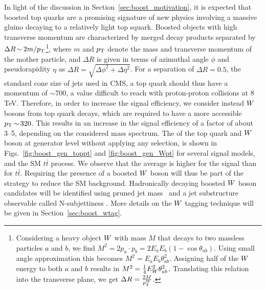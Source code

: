

In light of the discussion in Section~\ref{sec:boost_motivation}, it is expected that boosted top
quarks are a promising signature of new physics involving a massive gluino decaying to a relatively
light top squark.
Boosted objects with high transverse momentum are characterized by merged decay products
separated by $ \Delta R \,{\sim}\, 2m/p_{\mathrm{T}}$\footnote{Considering a heavy object $W$ with mass $M$
that decays to two massless particles $a$ and $b$, we find $M^2 = 2 p_a \cdot p_b = 2 E_a E_b (1
- \cos{\theta_{ab}})$. Using small angle approximation this becomes $M^2 = E_a E_b
\theta_{ab}^2$. Assigning half of the $W$ energy to both $a$ and $b$ results in $M^2 =
\frac{1}{4} E_{W}^2 \theta_{ab}^2$. Translating this relation into the transverse plane, we get
$\Delta R = \frac{2 M}{p_{\mathrm{T}}^{W}}$.}, 
where $m$ and $p_{\mathrm{T}}$ denote the mass and transverse momentum of the mother particle, and $\Delta R$
is given in terms of azimuthal angle $\phi$ and pseudorapidity $\eta$ as $\Delta R = \sqrt{\Delta
\phi^2 + \Delta \eta^2}$.
For a separation of $\Delta R = 0.5$, the standard cone size of jets used in CMS, a top
quark should thus have a momentum of ${\sim}700$\GeV, a value difficult to reach with proton-proton
collisions at 8 TeV. 
Therefore, in order to increase the signal efficiency, we consider instead $W$ bosons from top
quark decays, which are required to have a more accessible $p_{\mathrm{T}} \,{\sim}\, 320$\GeV.  This results
in an increase in the signal efficiency of a factor of about 3--5, depending on the considered mass
spectrum. 
The \pt of the top quark and $W$ boson at generator
level without applying any selection, is shown in Figs.~\ref{fig:boost_gen_toppt} and
\ref{fig:boost_gen_Wpt} for several signal models, and the SM $t\bar{t}$ process. 
We observe that the average \pt is higher for the signal than for $t\bar{t}$. Requiring the
presence of a boosted $W$ boson will thus be part of the strategy to reduce the SM background.
Hadronically decaying boosted $W$ boson candidates will be identified using pruned jet
mass~\cite{Ellis:2009su,Ellis:2009me,Chatrchyan:2013vbb} and a jet substructure observable
called N-subjettiness \cite{Thaler:2010tr}. More details on the $W$ tagging technique will be given
in Section~\ref{sec:boost_wtag}. 

